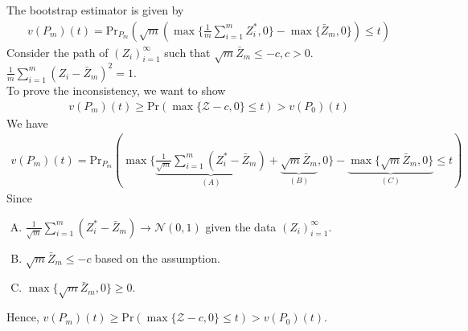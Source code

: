 \documentclass[11pt]{elegantbook}
\begin{document}
\begin{enumerate}
\begin{example}
        The bootstrap estimator is given by
        \begin{equation}
            \begin{aligned}
                v(P_m)(t)=\text{Pr}_{P_m}\left(\sqrt{m}\left(\max\{\frac{1}{m}\sum_{i=1}^mZ_i^*,0\}-\max\{\bar{Z}_m,0\}\right)\leq t\right)
            \end{aligned}
            \nonumber
        \end{equation}
        Consider the path of $\left(Z_i\right)_{i=1}^\infty$ such that $\sqrt{m}\bar{Z}_m\leq -c, c>0$. $\frac{1}{m}\sum_{i=1}^m\left(Z_i-\bar{Z}_m\right)^2=1$.\\
        To prove the inconsistency, we want to show
        \begin{equation}
            \begin{aligned}
                v(P_m)(t)\geq\text{Pr}\left(\max\{\mathcal{Z}-c,0\}\leq t\right)>v(P_0)(t)
            \end{aligned}
            \nonumber
        \end{equation}
        We have
        \begin{equation}
            \begin{aligned}
                v(P_m)(t)=\text{Pr}_{P_m}\left(\max\{\underbrace{\frac{1}{\sqrt{m}}\sum_{i=1}^m(Z_i^*-\bar{Z}_m)}_{(A)}+\underbrace{\sqrt{m}\bar{Z}_m}_{(B)},0\}-\underbrace{\max\{\sqrt{m}\bar{Z}_m,0\}}_{(C)}\leq t\right)
            \end{aligned}
            \nonumber
        \end{equation}
        Since
        \begin{enumerate}[(A).]
            \item $\frac{1}{\sqrt{m}}\sum_{i=1}^m(Z_i^*-\bar{Z}_m) \rightarrow \mathcal{N}(0,1)$ given the data $\left(Z_i\right)_{i=1}^\infty$.
            \item $\sqrt{m}\bar{Z}_m\leq-c$ based on the assumption.
            \item $\max\{\sqrt{m}\bar{Z}_m,0\}\geq 0$.
        \end{enumerate}
        Hence, $v(P_m)(t)\geq \text{Pr}\left(\max\{\mathcal{Z}-c,0\}\leq t\right)>v(P_0)(t)$.
    \end{example}
\end{enumerate}
\end{document}
